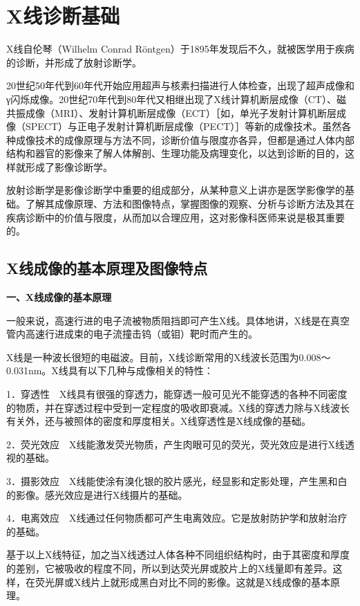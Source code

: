 \chapter{X线诊断基础}


X线自伦琴（Wilhelm Conrad
Röntgen）于1895年发现后不久，就被医学用于疾病的诊断，并形成了放射诊断学。

20世纪50年代到60年代开始应用超声与核素扫描进行人体检查，出现了超声成像和γ闪烁成像。20世纪70年代到80年代又相继出现了X线计算机断层成像（CT）、磁共振成像（MRI）、发射计算机断层成像（ECT）［如，单光子发射计算机断层成像（SPECT）与正电子发射计算机断层成像（PECT）］等新的成像技术。虽然各种成像技术的成像原理与方法不同，诊断价值与限度亦各异，但都是通过人体内部结构和器官的影像来了解人体解剖、生理功能及病理变化，以达到诊断的目的，这样就形成了影像诊断学。

放射诊断学是影像诊断学中重要的组成部分，从某种意义上讲亦是医学影像学的基础。了解其成像原理、方法和图像特点，掌握图像的观察、分析与诊断方法及其在疾病诊断中的价值与限度，从而加以合理应用，这对影像科医师来说是极其重要的。

\section{X线成像的基本原理及图像特点}

\textbf{一、X线成像的基本原理}

一般来说，高速行进的电子流被物质阻挡即可产生X线。具体地讲，X线是在真空管内高速行进成束的电子流撞击钨（或钼）靶时而产生的。

X线是一种波长很短的电磁波。目前，X线诊断常用的X线波长范围为0.008～0.031nm。X线具有以下几种与成像相关的特性：

1．穿透性　X线具有很强的穿透力，能穿透一般可见光不能穿透的各种不同密度的物质，并在穿透过程中受到一定程度的吸收即衰减。X线的穿透力除与X线波长有关外，还与被照体的密度和厚度相关。X线穿透性是X线成像的基础。

2．荧光效应　X线能激发荧光物质，产生肉眼可见的荧光，荧光效应是进行X线透视的基础。

3．摄影效应　X线能使涂有溴化银的胶片感光，经显影和定影处理，产生黑和白的影像。感光效应是进行X线摄片的基础。

4．电离效应　X线通过任何物质都可产生电离效应。它是放射防护学和放射治疗的基础。

基于以上X线特征，加之当X线透过人体各种不同组织结构时，由于其密度和厚度的差别，它被吸收的程度不同，所以到达荧光屏或胶片上的X线量即有差异。这样，在荧光屏或X线片上就形成黑白对比不同的影像。这就是X线成像的基本原理。


